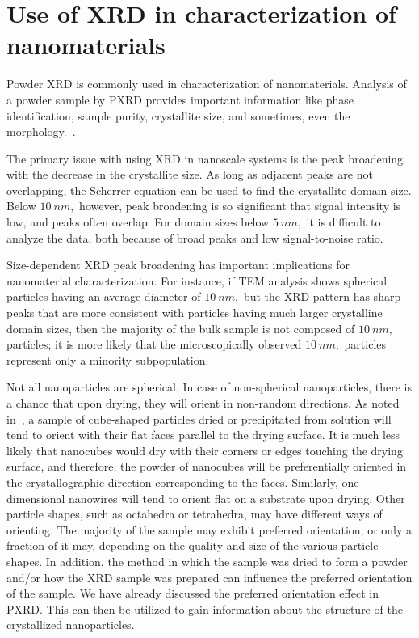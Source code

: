 \section{Use of XRD in characterization of nanomaterials}

Powder XRD is commonly used in characterization of nanomaterials. Analysis of a powder sample by PXRD provides important information like phase identification, sample purity, crystallite size, and sometimes, even the morphology.~\cite{Holder2019}.

The primary issue with using XRD in nanoscale systems is the peak broadening with the decrease in the crystallite size. As long as adjacent peaks are not overlapping, the Scherrer equation can be used to find the crystallite domain size. Below $\SI{10}{nm},$ however, peak broadening is so significant that signal intensity is low, and peaks often overlap. For domain sizes below $\SI{5}{nm},$ it is difficult to analyze the data, both because of broad peaks and low signal-to-noise ratio.

Size-dependent XRD peak broadening has important implications for nanomaterial characterization. For instance, if TEM analysis shows spherical particles having an average diameter of $\SI{10}{nm},$ but the XRD pattern has sharp peaks that are more consistent with particles having much larger crystalline domain sizes, then the majority of the bulk sample is not composed of $\SI{10}{nm},$ particles; it is more likely that the microscopically observed $\SI{10}{nm},$ particles represent only a minority subpopulation.

Not all nanoparticles are spherical. In case of non-spherical nanoparticles, there is a chance that upon drying, they will orient in non-random directions. As noted in~\cite{Holder2019}, a sample of cube-shaped particles dried or precipitated from solution will tend to orient with their flat faces parallel to the drying surface. It is much less likely that nanocubes would dry with their corners or edges touching the drying surface, and therefore, the powder of nanocubes will be preferentially oriented in the crystallographic direction corresponding to the faces. Similarly, one-dimensional nanowires will tend to orient flat on a substrate upon drying. Other particle shapes, such as octahedra or tetrahedra, may have different ways of orienting. The majority of the sample may exhibit preferred orientation, or only a fraction of it may, depending on the quality and size of the various particle shapes. In addition, the method in which the sample was dried to form a powder and/or how the XRD sample was prepared can influence the preferred orientation of the sample. We have already discussed the preferred orientation effect in PXRD. This can then be utilized to gain information about the structure of the crystallized nanoparticles.

